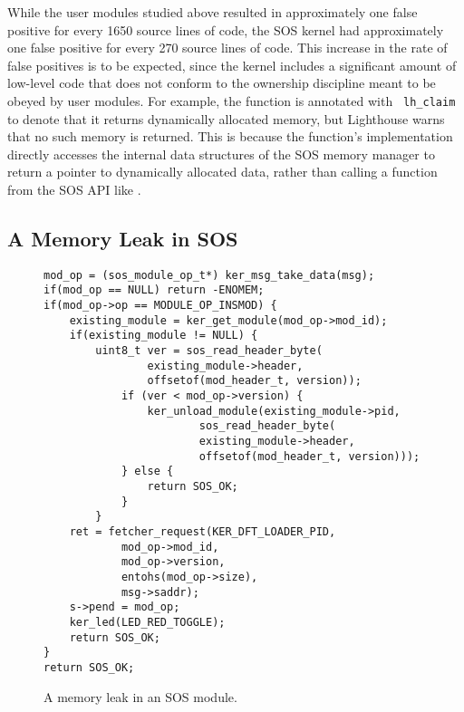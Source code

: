 While the user modules studied above resulted 
in approximately one false positive for every 1650 source lines of 
code, the SOS kernel had approximately one
false positive for every 270 source lines of code.  
This increase in the rate of false positives is to be expected, since
the kernel includes a significant amount of low-level code that does
not conform to the ownership discipline meant to be obeyed by user
modules.
For example,
the function  is annotated with {\tt
  lh\_claim} to denote that
it returns dynamically allocated memory, but Lighthouse warns that
no such memory is returned.  This is because the function's
implementation directly
accesses the internal data structures of the SOS memory manager to
return a pointer to dynamically allocated data, rather than calling a
function from the SOS API like 
.


%
% 

\subsection{A Memory Leak in SOS}
\label{ss:tale}

\begin{figure}[tp]
\begin{scriptsize}
\begin{verbatim}
mod_op = (sos_module_op_t*) ker_msg_take_data(msg);
if(mod_op == NULL) return -ENOMEM;
if(mod_op->op == MODULE_OP_INSMOD) {
    existing_module = ker_get_module(mod_op->mod_id);
    if(existing_module != NULL) {
        uint8_t ver = sos_read_header_byte(
                existing_module->header,
                offsetof(mod_header_t, version));
            if (ver < mod_op->version) {
                ker_unload_module(existing_module->pid, 
                        sos_read_header_byte(
                        existing_module->header,
                        offsetof(mod_header_t, version)));
            } else {
                return SOS_OK;
            }
        }
    ret = fetcher_request(KER_DFT_LOADER_PID,
            mod_op->mod_id,
            mod_op->version,
            entohs(mod_op->size),
            msg->saddr);
    s->pend = mod_op;
    ker_led(LED_RED_TOGGLE);
    return SOS_OK;
}
return SOS_OK;
\end{verbatim}
\end{scriptsize}
\caption{\label{fig:leak}A memory leak in an SOS module.}
\end{figure}

